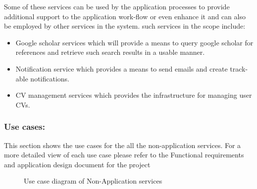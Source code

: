 \documentclass[12pt]{article}
\begin{document}
 Some of these services can be used by the application processes to provide additional support to the application work-flow or even enhance it and can also be employed by other services in the system. such services in the scope include:
 \begin{itemize}
 	\item Google scholar services which will provide a means to query google scholar for references and retrieve such search results in a usable manner.
 	\item Notification service which provides a means to send emails and create track-able notifications.
 	\item CV management services which provides the infrastructure for managing user CVs.
\end{itemize} 

\newpage
\subsubsection{Use cases:}
This section shows the use cases for the all the non-application services. For a more detailed view of each use case please refer to the Functional requirements and application design document for the project 

\begin{figure}[H]
\centering	
{}
\caption{Use case diagram of Non-Application services}
\end{figure}
\end{document}
